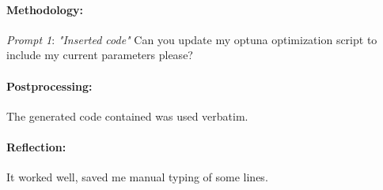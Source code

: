 \documentclass[a4paper,10pt]{article} %
\begin{document}
\paragraph{Methodology:} 
\textit{Prompt 1}: \textit{"Inserted code"}
\noindent
Can you update my optuna optimization script to include my current parameters please?

\paragraph{Postprocessing:} 
The generated code contained was used verbatim. 
\paragraph{Reflection:} 
It worked well, saved me manual typing of some lines.
\end{document}
